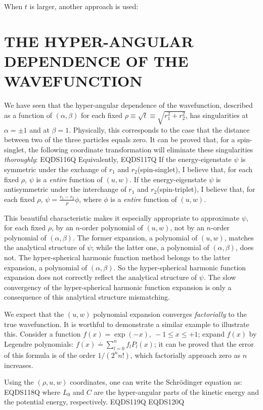 When $t$ is larger, another approach is used:

\section{THE HYPER-ANGULAR DEPENDENCE OF THE WAVEFUNCTION}

We have seen that the hyper-angular dependence of the wavefunction,
described as a function of $(\alpha,\beta)$ for each fixed
$\rho\equiv\sqrt{t}\equiv\sqrt{r_{1}^2+r_{2}^2}$, has
singularities at $\alpha=\pm 1$ and at $\beta=1$. Physically,
this corresponds to the case that the distance between two of the three
particles equals zero. It can be proved that,
for a spin-singlet, the following coordinate
transformation will eliminate these singularities \emph{thoroughly}:
 EQDS116Q 
Equivalently,
 EQDS117Q 
If the energy-eigenstate $\psi$ is symmetric under the exchange
of $r_1$ and $r_2$(spin-singlet),
I believe that, for each fixed $\rho$, $\psi$ is a \emph{entire}
function of $(u,w)$.
If the energy-eigenstate $\psi$ is antisymmetric under the interchange
of $r_1$ and $r_2$(spin-triplet), I believe that, for each fixed $\rho$,
$\psi=\frac{r_{1}-r_{2}}{\rho}\phi$, where $\phi$ is a \emph{entire}
function of $(u,w)$.

This beautiful characteristic makes it especially appropriate to approximate
$\psi$, for each fixed $\rho$, by an $n$-order polynomial of $(u,w)$, not by
an $n$-order polynomial of $(\alpha,\beta)$. The former expansion, a polynomial
of $(u,w)$, matches the analytical structure of $\psi$; while the latter one,
a polynomial of $(\alpha,\beta)$, does not. The hyper-spherical harmonic
function method belongs to the latter expansion, a polynomial of
$(\alpha,\beta)$. So the hyper-spherical harmonic function expansion does not
correctly reflect the analytical structure of $\psi$. The slow convergency
of the hyper-spherical harmonic function expansion is only a consequence of
this analytical structure mismatching.

We expect that the $(u,w)$ polynomial expansion converges \emph{factorially}
to the true wavefunction. It is worthful to demonstrate a similar example
to illustrate this. Consider a function $f(x)=\exp(-x),~-1\le x \le +1$;
expand $f(x)$ by Legendre polynomials:
$f(x)\doteq\sum_{l=0}^{n}f_{l}P_{l}(x)$; it can be proved that the error
of this formula is of the order $1/(2^{n}n!)$, which factorially approach zero
as $n$ increases.

Using the $(\rho,u,w)$ coordinates, one can write the Schr\"{o}dinger
equation as:
 EQDS118Q 
where $L_0$ and $C$ are the hyper-angular parts of the kinetic energy and
the potential energy, respectively.
 EQDS119Q 
 EQDS120Q 

